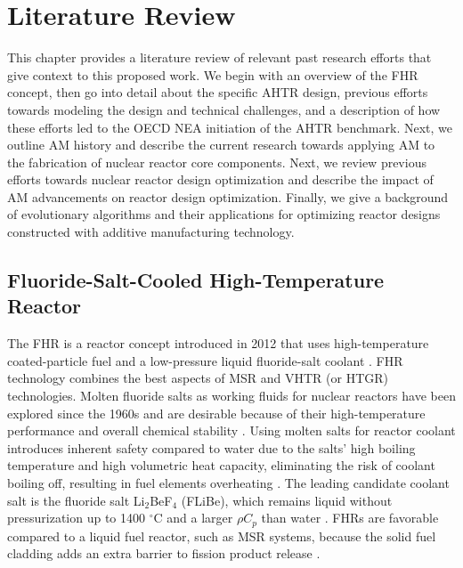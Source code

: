 \chapter{Literature Review}

This chapter provides a literature review of relevant past research efforts 
that give context to this proposed work.
We begin with an overview of the \gls{FHR} concept, then go into detail about the 
specific \gls{AHTR} design, previous efforts towards modeling the design and 
technical challenges, and a description of how these efforts led to the \gls{OECD} 
\gls{NEA} initiation of the \gls{AHTR} benchmark.
Next, we outline \gls{AM} history and describe the current research towards applying 
\gls{AM} to the fabrication of nuclear reactor core components. 
Next, we review previous efforts towards nuclear reactor design optimization 
and describe the impact of \gls{AM} advancements on reactor 
design optimization. 
Finally, we give a background of evolutionary algorithms and their applications for
optimizing reactor designs constructed with additive manufacturing technology.

\section{Fluoride-Salt-Cooled High-Temperature Reactor}
The \gls{FHR} is a reactor concept introduced in 2012 that uses high-temperature 
coated-particle fuel and a low-pressure liquid fluoride-salt coolant 
\cite{forsberg_fluoride-salt-cooled_2012,facilitators_fluoride-salt-cooled_2013}.
\gls{FHR} technology combines the best aspects of \gls{MSR} and \gls{VHTR} 
(or \gls{HTGR}) technologies. 
Molten fluoride salts as working fluids for nuclear reactors have been explored 
since the 1960s and are desirable because of their high-temperature 
performance and overall chemical stability \cite{scarlat_design_2014}.  
Using molten salts for reactor coolant introduces inherent safety compared 
to water due to the salts' high boiling temperature and high volumetric 
heat capacity, eliminating the risk of coolant boiling off, resulting in 
fuel elements overheating \cite{ho_molten_2013}. 
The leading candidate coolant salt is the fluoride salt Li$_2$BeF$_4$ (FLiBe), 
which remains liquid without pressurization up to 1400 $^{\circ}$C and a larger 
$\rho C_p$ than water \cite{ho_molten_2013,forsberg_fluoride-salt-cooled_2012}. 
\glspl{FHR} are favorable compared to a liquid fuel reactor, such as
\gls{MSR} systems, because the solid fuel cladding adds an extra barrier to fission 
product release 
\cite{ho_molten_2013}.

